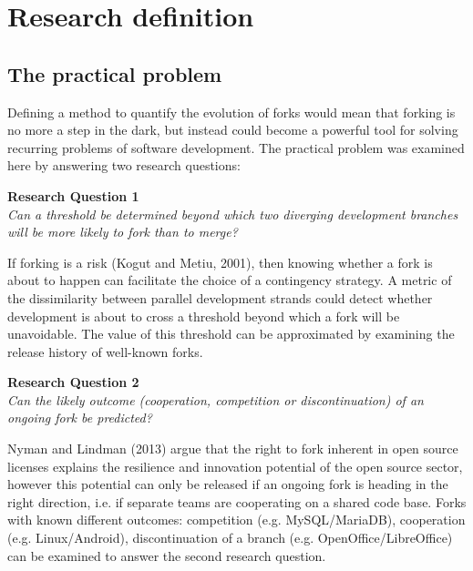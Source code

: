 
\chapter{Research definition} %

\label{Chapter2} %


\section{The practical problem}

Defining a method to quantify the evolution of forks would mean that forking is no more a step in the dark, but instead could become a powerful tool for solving recurring problems of software development. The practical problem was examined here by answering two research questions:

\begin{description}
\item{\textbf{Research Question 1}} \hfill \\ \textit{Can a threshold be determined beyond which two diverging development branches will be more likely to fork than to merge?}
\end{description}

\noindent
If forking is a risk (Kogut and Metiu, 2001), then knowing whether a fork is about to happen can facilitate the choice of a contingency strategy. A metric of the dissimilarity between parallel development strands could detect whether development is about to cross a threshold beyond which a fork will be unavoidable. The value of this threshold can be approximated by examining the release history of well-known forks.

\begin{description}
\item{\textbf{Research Question 2}} \hfill \\ \textit{Can the likely outcome (cooperation, competition or discontinuation) of an ongoing fork be predicted?}
\end{description}

\noindent
Nyman and Lindman (2013) argue that the right to fork inherent in open source licenses explains the resilience and innovation potential of the open source sector, however this potential can only be released if an ongoing fork is heading in the right direction, i.e. if separate teams are cooperating on a shared code base. Forks with known different outcomes: competition (e.g. MySQL/MariaDB), cooperation (e.g. Linux/Android), discontinuation of a branch (e.g. OpenOffice/LibreOffice) can be examined to answer the second research question.


